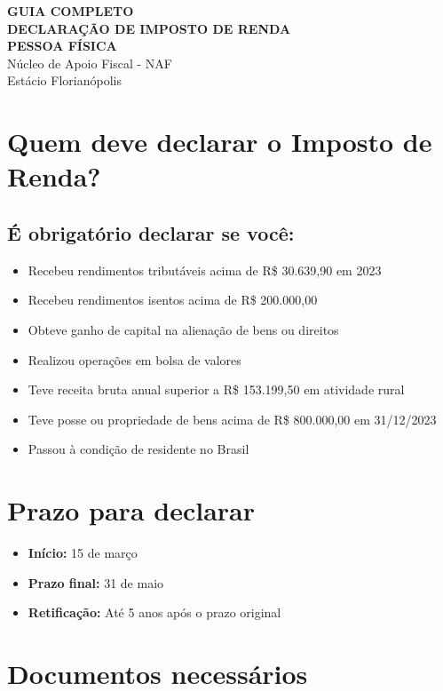 \documentclass[12pt,a4paper]{article}
\begin{document}
\begin{center}
{\LARGE \textbf{GUIA COMPLETO}}\\[0.5cm]
{\Large \textbf{DECLARAÇÃO DE IMPOSTO DE RENDA}}\\[0.3cm]
{\Large \textbf{PESSOA FÍSICA}}\\[0.5cm]
{\large Núcleo de Apoio Fiscal - NAF}\\
{\large Estácio Florianópolis}\\[1cm]
\end{center}

\section{Quem deve declarar o Imposto de Renda?}

\subsection{É obrigatório declarar se você:}
\begin{itemize}
    \item Recebeu rendimentos tributáveis acima de R\$ 30.639,90 em 2023
    \item Recebeu rendimentos isentos acima de R\$ 200.000,00
    \item Obteve ganho de capital na alienação de bens ou direitos
    \item Realizou operações em bolsa de valores
    \item Teve receita bruta anual superior a R\$ 153.199,50 em atividade rural
    \item Teve posse ou propriedade de bens acima de R\$ 800.000,00 em 31/12/2023
    \item Passou à condição de residente no Brasil
\end{itemize}

\section{Prazo para declarar}

\begin{itemize}
    \item \textbf{Início:} 15 de março
    \item \textbf{Prazo final:} 31 de maio
    \item \textbf{Retificação:} Até 5 anos após o prazo original
\end{itemize}

\section{Documentos necessários}
\end{document}
